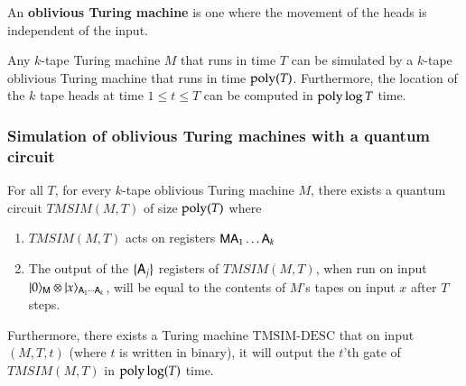 An \textbf{oblivious Turing machine} is one where the movement of the heads is independent of the input.

\begin{theorem}\label{thm:pippenger}
Any $k$-tape Turing machine $M$ that runs in time $T$ can be simulated by a $k$-tape oblivious Turing machine that runs in time $\operatorname{poly}(T)$. Furthermore, the location of the $k$ tape heads at time $1 \leq t \leq T$ can be computed in $\operatorname{poly} \log T$ time.
\end{theorem}


\subsubsection{Simulation of oblivious Turing machines with a quantum circuit}

\begin{lemma}\label{lem:tmsim}
	For all $T$, for every $k$-tape oblivious Turing machine $M$, there exists a quantum circuit $TMSIM(M,T)$ of size $\operatorname{poly}(T)$ where
	\begin{enumerate}
		\item $TMSIM(M,T)$ acts on registers ${\mathsf{M}} {\mathsf{A}}_1 \ldots {\mathsf{A}}_k$
		\item The output of the $\{{\mathsf{A}}_j\}$ registers of $TMSIM(M,T)$, when run on input $|0\rangle_{{\mathsf{M}}} \otimes |x\rangle_{{\mathsf{A}}_1 \cdots {\mathsf{A}}_k}$, will be equal to the contents of $M$'s tapes on input $x$ after $T$ steps.
	\end{enumerate}
	Furthermore, there exists a Turing machine $\text{TMSIM-DESC}$ that on input $(M,T,t)$ (where $t$ is written in binary), it will output the $t$'th gate of $TMSIM(M,T)$ in $\operatorname{poly}\log(T)$ time. 
\end{lemma}

